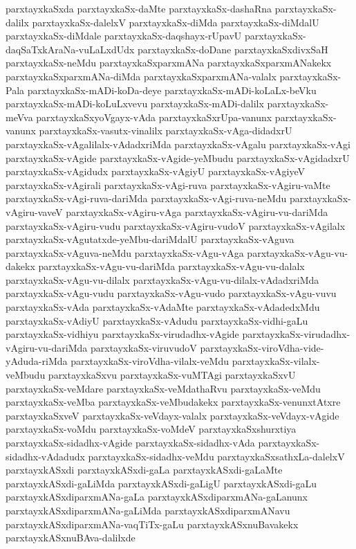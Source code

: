 {parxtayxkaSxda
parxtayxkaSx-daMte
parxtayxkaSx-dashaRna
parxtayxkaSx-dalilx
parxtayxkaSx-dalelxV
parxtayxkaSx-diMda
parxtayxkaSx-diMdalU
parxtayxkaSx-diMdale
parxtayxkaSx-daqshayx-rUpavU
parxtayxkaSx-daqSaTxkAraNa-vuLaLxdUdx
parxtayxkaSx-doDane
parxtayxkaSxdivxSaH
parxtayxkaSx-neMdu
parxtayxkaSxparxmANa
parxtayxkaSxparxmANakekx
parxtayxkaSxparxmANa-diMda
parxtayxkaSxparxmANa-valalx
parxtayxkaSx-Pala
parxtayxkaSx-mADi-koDa-deye
parxtayxkaSx-mADi-koLaLx-beVku
parxtayxkaSx-mADi-koLuLxvevu
parxtayxkaSx-mADi-dalilx
parxtayxkaSx-meVva
parxtayxkaSxyoVgayx-vAda
parxtayxkaSxrUpa-vanunx
parxtayxkaSx-vanunx
parxtayxkaSx-vasutx-vinalilx
parxtayxkaSx-vAga-didadxrU
parxtayxkaSx-vAgalilalx-vAdadxriMda
parxtayxkaSx-vAgalu
parxtayxkaSx-vAgi
parxtayxkaSx-vAgide
parxtayxkaSx-vAgide-yeMbudu
parxtayxkaSx-vAgidadxrU
parxtayxkaSx-vAgidudx
parxtayxkaSx-vAgiyU
parxtayxkaSx-vAgiyeV
parxtayxkaSx-vAgirali
parxtayxkaSx-vAgi-ruva
parxtayxkaSx-vAgiru-vaMte
parxtayxkaSx-vAgi-ruva-dariMda
parxtayxkaSx-vAgi-ruva-neMdu
parxtayxkaSx-vAgiru-vaveV
parxtayxkaSx-vAgiru-vAga
parxtayxkaSx-vAgiru-vu-dariMda
parxtayxkaSx-vAgiru-vudu
parxtayxkaSx-vAgiru-vudoV
parxtayxkaSx-vAgilalx
parxtayxkaSx-vAgutatxde-yeMbu-dariMdalU
parxtayxkaSx-vAguva
parxtayxkaSx-vAguva-neMdu
parxtayxkaSx-vAgu-vAga
parxtayxkaSx-vAgu-vu-dakekx
parxtayxkaSx-vAgu-vu-dariMda
parxtayxkaSx-vAgu-vu-dalalx
parxtayxkaSx-vAgu-vu-dilalx
parxtayxkaSx-vAgu-vu-dilalx-vAdadxriMda
parxtayxkaSx-vAgu-vudu
parxtayxkaSx-vAgu-vudo
parxtayxkaSx-vAgu-vuvu
parxtayxkaSx-vAda
parxtayxkaSx-vAdaMte
parxtayxkaSx-vAdadedxMdu
parxtayxkaSx-vAdiyU
parxtayxkaSx-vAdudu
parxtayxkaSx-vidhi-gaLu
parxtayxkaSx-vidhiyu
parxtayxkaSx-virudadhx-vAgide
parxtayxkaSx-virudadhx-vAgiru-vu-dariMda
parxtayxkaSx-viruvudoV
parxtayxkaSx-viroVdha-vide-yAduda-riMda
parxtayxkaSx-viroVdha-vilalx-veMdu
parxtayxkaSx-vilalx-veMbudu
parxtayxkaSxvu
parxtayxkaSx-vuMTAgi
parxtayxkaSxvU
parxtayxkaSx-veMdare
parxtayxkaSx-veMdathaRvu
parxtayxkaSx-veMdu
parxtayxkaSx-veMba
parxtayxkaSx-veMbudakekx
parxtayxkaSx-venunxtAtxre
parxtayxkaSxveV
parxtayxkaSx-veVdayx-valalx
parxtayxkaSx-veVdayx-vAgide
parxtayxkaSx-voMdu
parxtayxkaSx-voMdeV
parxtayxkaSxshurxtiya
parxtayxkaSx-sidadhx-vAgide
parxtayxkaSx-sidadhx-vAda
parxtayxkaSx-sidadhx-vAdadudx
parxtayxkaSx-sidadhx-veMdu
parxtayxkaSxsathxLa-dalelxV
parxtayxkASxdi
parxtayxkASxdi-gaLa
parxtayxkASxdi-gaLaMte
parxtayxkASxdi-gaLiMda
parxtayxkASxdi-gaLigU
parxtayxkASxdi-gaLu
parxtayxkASxdiparxmANa-gaLa
parxtayxkASxdiparxmANa-gaLanunx
parxtayxkASxdiparxmANa-gaLiMda
parxtayxkASxdiparxmANavu
parxtayxkASxdiparxmANa-vaqTiTx-gaLu
parxtayxkASxnuBavakekx
parxtayxkASxnuBAva-dalilxde
}
